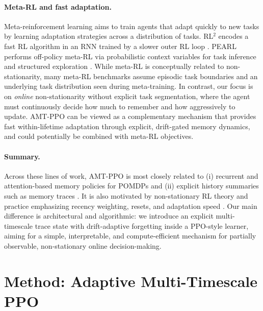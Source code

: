 \documentclass{article}
\begin{document}
\paragraph{Meta-RL and fast adaptation.}
Meta-reinforcement learning aims to train agents that adapt quickly to new tasks by learning adaptation strategies across a distribution of tasks. RL$^2$ encodes a fast RL algorithm in an RNN trained by a slower outer RL loop \citep{duan2016rl2}. PEARL performs off-policy meta-RL via probabilistic context variables for task inference and structured exploration \citep{pmlr-v97-rakelly19a}. While meta-RL is conceptually related to non-stationarity, many meta-RL benchmarks assume episodic task boundaries and an underlying task distribution seen during meta-training. In contrast, our focus is on \emph{online} non-stationarity without explicit task segmentation, where the agent must continuously decide how much to remember and how aggressively to update. AMT-PPO can be viewed as a complementary mechanism that provides fast within-lifetime adaptation through explicit, drift-gated memory dynamics, and could potentially be combined with meta-RL objectives.

\paragraph{Summary.}
Across these lines of work, AMT-PPO is most closely related to (i) recurrent and attention-based memory policies for POMDPs \citep{hausknecht2015drqn,pmlr-v119-parisotto20a} and (ii) explicit history summaries such as memory traces \citep{pmlr-v267-eberhard25a}. It is also motivated by non-stationary RL theory and practice emphasizing recency weighting, resets, and adaptation speed \citep{pmlr-v119-cheung20a,DBLP:conf/nips/FeiYWX20}. Our main difference is architectural and algorithmic: we introduce an explicit multi-timescale trace state with drift-adaptive forgetting inside a PPO-style learner, aiming for a simple, interpretable, and compute-efficient mechanism for partially observable, non-stationary online decision-making.


\section{Method: Adaptive Multi-Timescale PPO}
\end{document}
